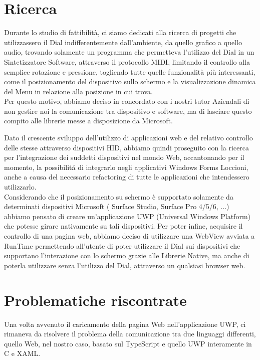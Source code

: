 \newpage
\section{Ricerca}

Durante lo studio di fattibilità, ci siamo dedicati alla ricerca di progetti che utilizzassero il Dial indifferentemente dall’ambiente, da quello grafico a quello audio, trovando solamente un programma che permetteva l'utilizzo del Dial in un Sintetizzatore Software, attraverso il protocollo MIDI, limitando il controllo alla semplice rotazione e pressione, togliendo tutte quelle funzionalità più interessanti, come il posizionamento del dispositivo sullo schermo e la visualizzazione dinamica del Menu in relazione alla posizione in cui trova.\\

Per questo motivo, abbiamo deciso in concordato con i nostri tutor Aziendali di non gestire noi la comunicazione tra dispositivo e software, ma di lasciare questo compito alle librerie messe a disposizione da Microsoft.

Dato il crescente sviluppo dell'utilizzo di applicazioni web e del relativo controllo delle stesse attraverso dispositivi HID, abbiamo quindi proseguito con la ricerca per l'integrazione dei suddetti dispositivi nel mondo Web, accantonando per il momento, la possibilitá di integrarlo negli applicativi Windows Forms Loccioni, anche a causa del necessario refactoring di tutte le applicazioni che intendessero utilizzarlo.\\

Considerando che il posizionamento su schermo è supportato solamente da determinati dispositivi Microsoft ( Surface Studio, Surface Pro 4/5/6, ...) abbiamo pensato di creare un’applicazione UWP (Universal Windows Platform) che potesse girare nativamente su tali dispositivi. Per poter infine, acquisire il controllo di una pagina web, abbiamo deciso di utilizzare una WebView avviata a RunTime permettendo all'utente di poter utilizzare il Dial sui dispositivi che supportano l'interazione con lo schermo grazie alle Librerie Native, ma anche di poterla utilizzare senza l'utilizzo del Dial, attraverso un qualsiasi browser web.

\newpage
\section{Problematiche riscontrate}

Una volta avvenuto il caricamento della pagina Web nell'applicazione UWP, ci rimaneva da risolvere il problema della comunicazione tra due linguaggi differenti, quello Web, nel nostro caso, basato sul TypeScript e quello UWP interamente in C e XAML.\\

